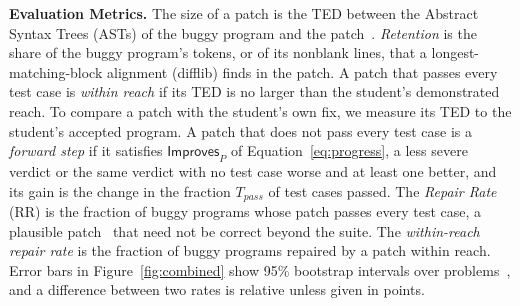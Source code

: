 \documentclass[conference]{IEEEtran}
\begin{document}
\noindent\textbf{Evaluation Metrics.} The size of a patch is the TED between the Abstract Syntax Trees (ASTs) of the buggy program and the patch~\cite{zhang1989simple,pawlik2016tree}. \emph{Retention} is the share of the buggy program's tokens, or of its nonblank lines, that a longest-matching-block alignment (difflib) finds in the patch. A patch that passes every test case is \emph{within reach} if its TED is no larger than the student's demonstrated reach. To compare a patch with the student's own fix, we measure its TED to the student's accepted program. A patch that does not pass every test case is a \emph{forward step} if it satisfies \(\mathsf{Improves}_P\) of Equation~\eqref{eq:progress}, a less severe verdict or the same verdict with no test case worse and at least one better, and its gain is the change in the fraction \(T_{\mathit{pass}}\) of test cases passed. The \emph{Repair Rate} (RR) is the fraction of buggy programs whose patch passes every test case, a plausible patch~\cite{smith2015cure} that need not be correct beyond the suite. The \emph{within-reach repair rate} is the fraction of buggy programs repaired by a patch within reach. Error bars in Figure~\ref{fig:combined} show 95\% bootstrap intervals over problems~\cite{efron1992bootstrap}, and a difference between two rates is relative unless given in points.
\end{document}
